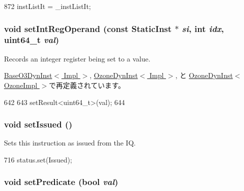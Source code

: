 \begin{DoxyCode}
872 { instListIt = _instListIt; }
\end{DoxyCode}
\hypertarget{classBaseDynInst_a654e99f2be7cd298378462ce9651bb44}{
\subsubsection[{setIntRegOperand}]{\setlength{\rightskip}{0pt plus 5cm}void setIntRegOperand (const {\bf StaticInst} $\ast$ {\em si}, \/  int {\em idx}, \/  uint64\_\-t {\em val})}}
\label{classBaseDynInst_a654e99f2be7cd298378462ce9651bb44}
Records an integer register being set to a value. 

\hyperlink{classBaseO3DynInst_a654e99f2be7cd298378462ce9651bb44}{BaseO3DynInst$<$ Impl $>$}, \hyperlink{classOzoneDynInst_a654e99f2be7cd298378462ce9651bb44}{OzoneDynInst$<$ Impl $>$}, と \hyperlink{classOzoneDynInst_a654e99f2be7cd298378462ce9651bb44}{OzoneDynInst$<$ OzoneImpl $>$}で再定義されています。


\begin{DoxyCode}
642     {
643         setResult<uint64_t>(val);
644     }
\end{DoxyCode}
\hypertarget{classBaseDynInst_a04eb3fc23b5c2e74dc6d12afc25f0198}{
\subsubsection[{setIssued}]{\setlength{\rightskip}{0pt plus 5cm}void setIssued ()}}
\label{classBaseDynInst_a04eb3fc23b5c2e74dc6d12afc25f0198}
Sets this instruction as issued from the IQ. 


\begin{DoxyCode}
716 { status.set(Issued); }
\end{DoxyCode}
\hypertarget{classBaseDynInst_a137a8c6cced89c2ff8387900439436b4}{
\subsubsection[{setPredicate}]{\setlength{\rightskip}{0pt plus 5cm}void setPredicate (bool {\em val})}}
\label{classBaseDynInst_a137a8c6cced89c2ff8387900439436b4}



